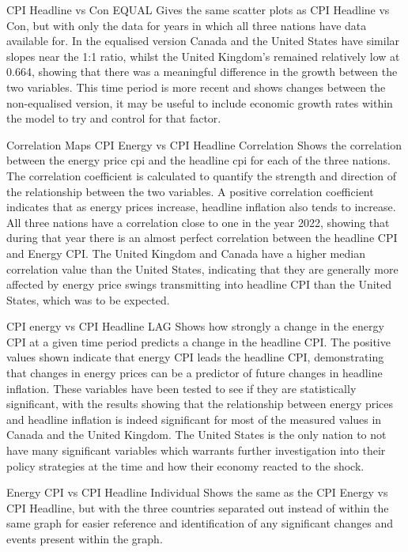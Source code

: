 CPI Headline vs Con EQUAL
Gives the same scatter plots as CPI Headline vs Con, but with only the data for years in which all three nations have data available for.
In the equalised version Canada and the United States have similar slopes near the 1:1 ratio, whilst the United Kingdom's remained relatively low at 0.664, showing that there was a meaningful difference in the growth between the two variables.
This time period is more recent and shows changes between the non-equalised version, it may be useful to include economic growth rates within the model to try and control for that factor.

Correlation Maps
CPI Energy vs CPI Headline Correlation
Shows the correlation between the energy price cpi and the headline cpi for each of the three nations. The correlation coefficient is calculated to quantify the strength and direction of the relationship between the two variables. A positive correlation coefficient indicates that as energy prices increase, headline inflation also tends to increase.
All three nations have a correlation close to one in the year 2022, showing that during that year there is an almost perfect correlation between the headline CPI and Energy CPI.
The United Kingdom and Canada have a higher median correlation value than the United States, indicating that they are generally more affected by energy price swings transmitting into headline CPI than the United States, which was to be expected.

CPI energy vs CPI Headline LAG
Shows how strongly a change in the energy CPI at a given time period predicts a change in the headline CPI.
The positive values shown indicate that energy CPI leads the headline CPI, demonstrating that changes in energy prices can be a predictor of future changes in headline inflation.
These variables have been tested to see if they are statistically significant, with the results showing that the relationship between energy prices and headline inflation is indeed significant for most of the measured values in Canada and the United Kingdom.
The United States is the only nation to not have many significant variables which warrants further investigation into their policy strategies at the time and how their economy reacted to the shock.

Energy CPI vs CPI Headline Individual
Shows the same as the CPI Energy vs CPI Headline, but with the three countries separated out instead of within the same graph for easier reference and identification of any significant changes and events present within the graph.


